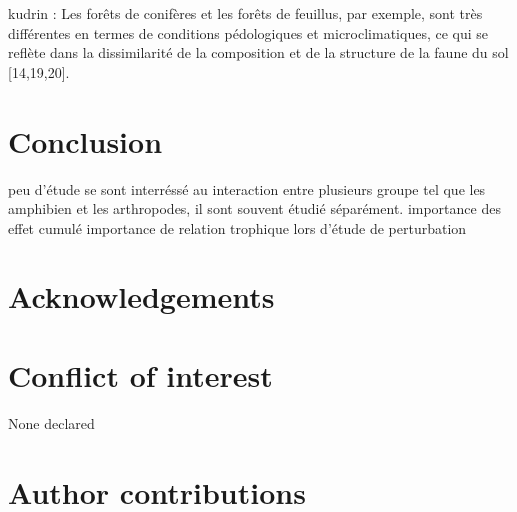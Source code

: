   kudrin :
Les forêts de conifères et les forêts de feuillus, par exemple, sont très différentes en termes de conditions pédologiques et microclimatiques, ce qui se reflète dans la dissimilarité de la composition et de la structure de la faune du sol [14,19,20].


\section*{Conclusion}
\label{sec:conclu1}

peu d'étude se sont interréssé au interaction entre plusieurs groupe tel que les amphibien et les arthropodes, il sont souvent étudié séparément.
importance des effet cumulé
importance de relation trophique lors d'étude de perturbation

\section*{Acknowledgements}
\label{sec:acknowl1}

\section*{Conflict of interest}
\label{sec:conflict1}

None declared
\section*{Author contributions}
\label{sec:author1}

\cleardoublepage

\begin{otherlanguage}{english}

\end{otherlanguage}
